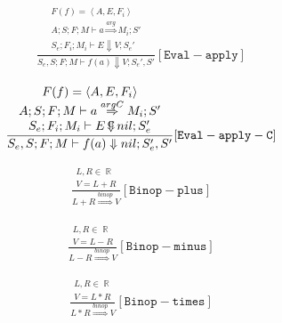 \documentclass{scrartcl}
\DeclareMathOperator{\numtype}{\mathbb{R}}
\DeclareMathOperator{\ceval}{\overset{C}{\smash{\Downarrow}}}
\begin{document}
    \begin{align*}
    \frac{
        \begin{matrix}
        F(f) = \left< A, E, F_i \right> \\
        A; S; F; M \vdash a \overset{arg}{\Rightarrow} M_i; S' \\
        S_e; F_i; M_i \vdash E \Downarrow V; S_e'
        \end{matrix}
    }{
        S_e, S; F; M \vdash f(a) \Downarrow V; S_e', S'
    }[\mathtt{Eval-apply}]
    \end{align*}
    
    \begin{align*}
    \frac{
        \begin{matrix}
        F(f) = \left< A, E, F_i \right> \\
        A; S; F; M \vdash a \overset{argC}{\Rightarrow} M_i; S' \\
        S_e; F_i; M_i \vdash E \ceval nil; S_e'
        \end{matrix}
    }{
        S_e, S; F; M \vdash f(a) \Downarrow nil; S_e', S'
    }[\mathtt{Eval-apply-C}]
    \end{align*}
    
    \begin{align*}
    \frac{
        \begin{matrix}
        L, R \in \numtype \\
        V = L + R
        \end{matrix}
    }{
        L + R \overset{binop}{\Rightarrow} V
    }[\mathtt{Binop-plus}]
    \end{align*}
    
    \begin{align*}
    \frac{
        \begin{matrix}
        L, R \in \numtype \\
        V = L - R
        \end{matrix}
    }{
        L - R \overset{binop}{\Rightarrow} V
    }[\mathtt{Binop-minus}]
    \end{align*}
    
    \begin{align*}
    \frac{
        \begin{matrix}
        L, R \in \numtype \\
        V = L * R
        \end{matrix}
    }{
        L * R \overset{binop}{\Rightarrow} V
    }[\mathtt{Binop-times}]
    \end{align*}
    
\end{document}
